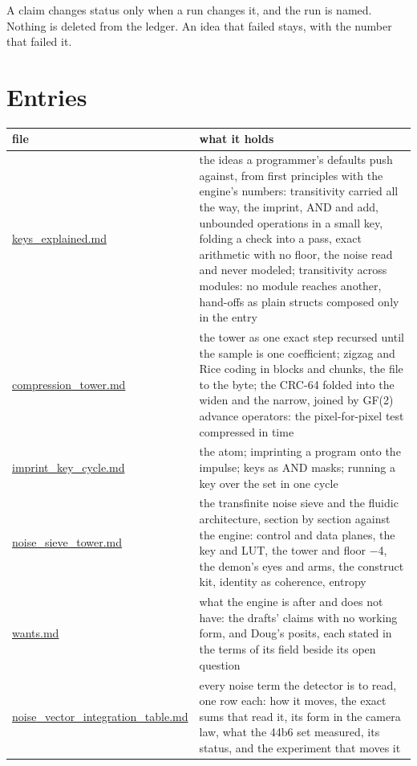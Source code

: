 A claim changes status only when a run changes it, and the run is named. Nothing is deleted from the ledger. An idea that failed stays, with the number that failed it.

\section{\texorpdfstring{Entries}{Entries}}

{\small
\setlength{\tabcolsep}{6pt}
\begin{longtable}{>{\RaggedRight\arraybackslash}p{}>{\RaggedRight\arraybackslash}p{}}
\toprule
file & what it holds \\
\midrule
\endhead
\hyperref[chap:keys-explained]{keys\_\allowbreak{}explained.md} & the ideas a programmer's defaults push against, from first principles with the engine's numbers: transitivity carried all the way, the imprint, AND and add, unbounded operations in a small key, folding a check into a pass, exact arithmetic with no floor, the noise read and never modeled; transitivity across modules: no module reaches another, hand-offs as plain structs composed only in the entry \\
\hyperref[chap:compression-tower]{compression\_\allowbreak{}tower.md} & the tower as one exact step recursed until the sample is one coefficient; zigzag and Rice coding in blocks and chunks, the file to the byte; the CRC-64 folded into the widen and the narrow, joined by GF(2) advance operators: the pixel-for-pixel test compressed in time \\
\hyperref[chap:imprint-key-cycle]{imprint\_\allowbreak{}key\_\allowbreak{}cycle.md} & the atom; imprinting a program onto the impulse; keys as AND masks; running a key over the set in one cycle \\
\hyperref[chap:noise-sieve-tower]{noise\_\allowbreak{}sieve\_\allowbreak{}tower.md} & the transfinite noise sieve and the fluidic architecture, section by section against the engine: control and data planes, the key and LUT, the tower and floor −4, the demon's eyes and arms, the construct kit, identity as coherence, entropy \\
\hyperref[chap:wants]{wants.md} & what the engine is after and does not have: the drafts' claims with no working form, and Doug's posits, each stated in the terms of its field beside its open question \\
\hyperref[chap:noise-vector-integration-table]{noise\_\allowbreak{}vector\_\allowbreak{}integration\_\allowbreak{}table.md} & every noise term the detector is to read, one row each: how it moves, the exact sums that read it, its form in the camera law, what the 44b6 set measured, its status, and the experiment that moves it \\

\end{longtable}}
